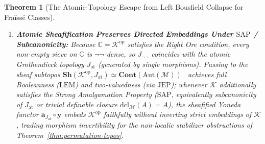 \documentclass[10pt,twoside,openright]{book}
\theoremstyle{crmplain}
\newtheorem{theorem}{Theorem}[section]
\theoremstyle{crmdef}
\theoremstyle{crmremark}
\begin{document}
\begin{theorem}[The Atomic-Topology Escape from Left Bousfield Collapse for Fraïssé Classes]
\begin{enumerate}[label=(\arabic*),leftmargin=2em]
  \item \textbf{Atomic Sheafification Preserves Directed Embeddings Under $\mathrm{SAP}$ / Subcanonicity:} Because $\mathbb{C} = \mathcal{K}^{\mathrm{op}}$ satisfies the Right Ore condition, every non-empty sieve on $\mathbb{C}$ is $\neg\neg$-dense, so $J_{\neg\neg}$ coincides with the atomic Grothendieck topology $J_{\mathrm{at}}$ (generated by single morphisms). Passing to the sheaf subtopos $\mathbf{Sh}(\mathcal{K}^{\mathrm{op}}, J_{\mathrm{at}}) \simeq \mathbf{Cont}(\mathrm{Aut}(\mathcal{M}))$~\cite{Caramello18} achieves full Booleanness ($\mathrm{LEM}$) and two-valuedness (via $\mathrm{JEP}$); whenever $\mathcal{K}$ additionally satisfies the Strong Amalgamation Property ($\mathrm{SAP}$, equivalently subcanonicity of $J_{\mathrm{at}}$ or trivial definable closure $\mathrm{dcl}_{\mathcal{M}}(A) = A$), the sheafified Yoneda functor $\mathbf{a}_{J_{\mathrm{at}}} \circ \mathbf{y}$ embeds $\mathcal{K}^{\mathrm{op}}$ faithfully without inverting strict embeddings of $\mathcal{K}$, trading morphism invertibility for the non-localic stabilizer obstructions of Theorem~\ref{thm:permutation-topos}.
\end{enumerate}
\end{theorem}
\end{document}
